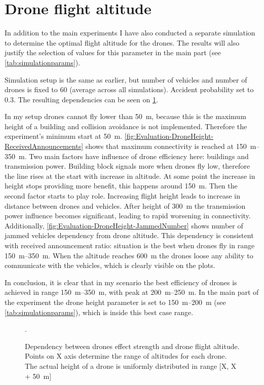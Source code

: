 \documentclass[]{nsm-thesis}
\begin{document}
\section{Drone flight altitude}

In addition to the main experiments I have also conducted a separate simulation to determine the optimal flight altitude for the drones. The results will also justify the selection of values for this parameter in the main part (see \cref{tab:simulationparams}).

Simulation setup is the same as earlier, but number of vehicles and number of drones is fixed to 60 (average across all simulations). Accident probability set to 0.3. The resulting dependencies can be seen on \cref{fig:Evaluation-DroneHeight}.

In my setup drones cannot fly lower than \SI{50}{\meter}, because this is the maximum height of a building and collision avoidance is not implemented. Therefore the experiment's minimum start at \SI{50}{\meter}. \cref{fig:Evaluation-DroneHeight-ReceivedAnnouncements} shows that maximum connectivity is reached at \SIrange{150}{350}{\meter}. Two main factors have influence of drone efficiency here: buildings and transmission power.  Building block signals more when drones fly low, therefore the line rises at the start with increase in altitude. At some point the increase in height stops providing more benefit, this happens around \SI{150}{\meter}. Then the second factor starts to play role. Increasing flight height leads to increase in distance between drones and vehicles. After height of \SI{300}{\meter} the transmission power influence becomes significant, leading to rapid worsening in connectivity. Additionally, \cref{fig:Evaluation-DroneHeight-JammedNumber} shows number of jammed vehicles dependency from drone altitude. This dependency is consistent with received announcement ratio: situation is the best when drones fly in range \SIrange{150}{350}{\meter}. When the altitude reaches \SI{600}{\meter} the drones loose any ability to communicate with the vehicles, which is clearly visible on the plots. 

In conclusion, it is clear that in my scenario the best efficiency of drones is achieved in range \SIrange{150}{350}{\meter}, with peak at \SIrange{200}{250}{\meter}. In the main part of the experiment the drone height parameter is set to \SIrange{150}{200}{\meter} (see \cref{tab:simulationparams}), which is inside this best case range.

\begin{figure}%
	\centering
	\hfill
	\hfill
	\caption{Dependency between drones effect strength and drone flight altitude. Points on X axis determine the range of altitudes for each drone. The actual height of a drone is uniformly distributed in range [X, X + \SI{50}{\meter}]}.%
	\label{fig:Evaluation-DroneHeight}%
\end{figure}
\end{document}
